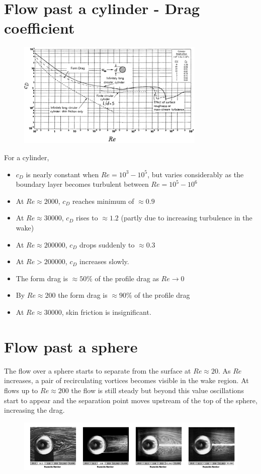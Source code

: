 \documentclass[class=report, crop=false, 12pt,a4paper]{standalone}
\begin{document}
\section{Flow past a cylinder - Drag coefficient}
\begin{figure}[H]
  \centering
  \includegraphics[width = 0.8\textwidth]{../img/diagram56.png}
\end{figure}
For a cylinder, 
\begin{itemize}
  \item $c_D$ is nearly constant when $Re = 10^3 - 10^5$, but varies considerably as the boundary layer becomes turbulent between $Re = 10^5 - 10^6$
  \item At $Re \approx 2000$, $c_D$ reaches minimum of $\approx 0.9$
  \item At $Re \approx 30000$, $c_D$ rises to $\approx 1.2$ (partly due to increasing turbulence in the wake)
  \item At $Re \approx 200000$, $c_D$ drops suddenly to $\approx 0.3$
  \item At $Re > 200000$, $c_D$ increases slowly. 
  \item The form drag is $\approx 50\%$ of the profile drag as $Re \rightarrow 0$
  \item By $Re \approx 200$ the form drag is $\approx 90\%$ of the profile drag
  \item At $Re \approx 30000$, skin friction is insignificant.
\end{itemize}
\section{Flow past a sphere}
The flow over a sphere starts to separate from the surface at $Re \approx 20$. As $Re$ increases, a pair of recirculating vortices becomes visible in the wake region. At flows up to $Re \approx 200$ the flow is still steady but beyond this value oscillations start to appear and the separation point moves upstream of the top of the sphere, increasing the drag. 
\begin{figure}[H]
  \centering
  \includegraphics[width = \textwidth]{../img/diagram57.png}
\end{figure}
\end{document}
